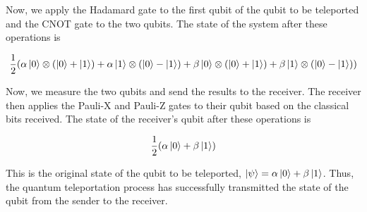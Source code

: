 \documentclass[10pt]{article}
\numberwithin{equation}{section}
\theoremstyle{defi}
\begin{document}
Now, we apply the Hadamard gate to the first qubit of the qubit to be teleported and the CNOT gate to the two qubits. The state of the system after these operations is

\begin{equation}
  \label{eq:28}
  \frac{1}{2}(\alpha\ket{0}\otimes(\ket{0} + \ket{1}) + \alpha\ket{1}\otimes(\ket{0} - \ket{1}) + \beta\ket{0}\otimes(\ket{0} + \ket{1}) + \beta\ket{1}\otimes(\ket{0} - \ket{1}))
\end{equation}

Now, we measure the two qubits and send the results to the receiver. The receiver then applies the Pauli-X and Pauli-Z gates to their qubit based on the classical bits received. The state of the receiver's qubit after these operations is

\begin{equation}
  \label{eq:29}
  \frac{1}{2}(\alpha\ket{0} + \beta\ket{1})
\end{equation}

This is the original state of the qubit to be teleported, $\ket{\psi} = \alpha\ket{0} + \beta\ket{1}$. Thus, the quantum teleportation process has successfully transmitted the state of the qubit from the sender to the receiver.




\newpage 

%
\end{document}

